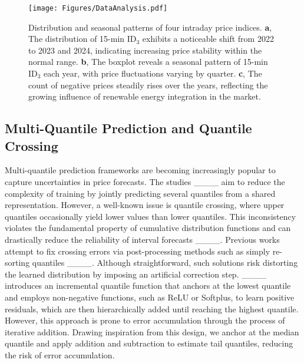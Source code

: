 \begin{figure*}[t]
\vskip 0.1in
\begin{center}
\centerline{\texttt{[image: Figures/DataAnalysis.pdf]}}
\caption{Distribution and seasonal patterns of four intraday price indices. 
\textbf{a}, The distribution of 15-min ID$_3$ exhibits a noticeable shift from 2022 to 2023 and 2024, indicating increasing price stability within the normal range.
\textbf{b}, The boxplot reveals a seasonal pattern of 15-min ID$_3$ each year, with price fluctuations varying by quarter.
\textbf{c}, The count of negative prices steadily rises over the years, reflecting the growing influence of renewable energy integration in the market.}
\label{datanalysis}
\end{center}
\vskip -0.3in
\end{figure*}

\subsection{Multi-Quantile Prediction and Quantile Crossing}

Multi-quantile prediction frameworks are becoming increasingly popular to capture uncertainties in price forecasts. The studies ____ aim to reduce the complexity of training by jointly predicting several quantiles from a shared representation. However, a well-known issue is quantile crossing, where upper quantiles occasionally yield lower values than lower quantiles. This inconsistency violates the fundamental property of cumulative distribution functions and can drastically reduce the reliability of interval forecasts ____.
Previous works attempt to fix crossing errors via post-processing methods such as simply re-sorting quantiles ____.
Although straightforward, such solutions risk distorting the learned distribution by imposing an artificial correction step. 
____ introduces an incremental quantile function that anchors at the lowest quantile and employs non-negative functions, such as ReLU or Softplus, to learn positive residuals, which are then hierarchically added until reaching the highest quantile. However, this approach is prone to error accumulation through the process of iterative addition. Drawing inspiration from this design, we anchor at the median quantile and apply addition and subtraction to estimate tail quantiles,  reducing the risk of error accumulation.